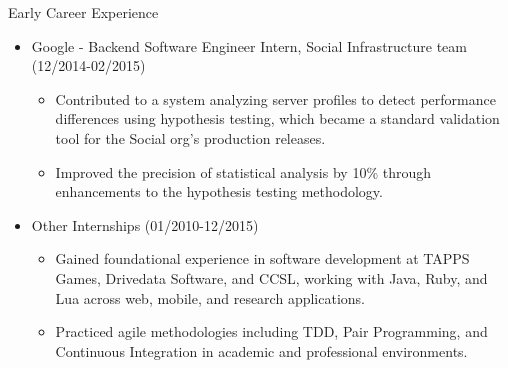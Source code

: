 
\normalsize{Early Career Experience}
\begin{itemize}
    \item \footnotesize{Google - Backend Software Engineer Intern, Social Infrastructure team (12/2014-02/2015)}
    \begin{itemize}
        \item \scriptsize{Contributed to a system analyzing server profiles to detect performance differences using hypothesis testing, which became a standard validation tool for the Social org's production releases.}
        \item \scriptsize{Improved the precision of statistical analysis by 10\% through enhancements to the hypothesis testing methodology.}
    \end{itemize}

    \item \footnotesize{Other Internships (01/2010-12/2015)}
    \begin{itemize}
        \item \scriptsize{Gained foundational experience in software development at TAPPS Games, Drivedata Software, and CCSL, working with Java, Ruby, and Lua across web, mobile, and research applications.}
        \item \scriptsize{Practiced agile methodologies including TDD, Pair Programming, and Continuous Integration in academic and professional environments.}
    \end{itemize}
\end{itemize}